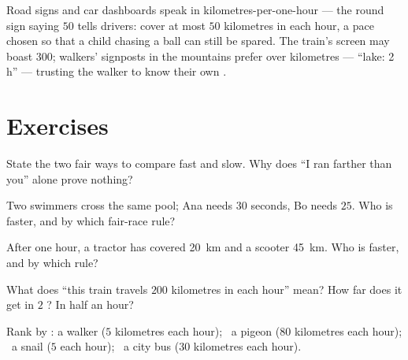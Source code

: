 \begin{example}\label{ex:g5:speed-distance-time:signs}
Road signs and car dashboards speak in kilometres-per-one-hour ---
the round sign saying $50$ tells drivers: cover at most $50$
kilometres in each hour, a pace chosen so that a child chasing a
ball can still be spared. The  train's screen may boast
$300$; walkers' signposts in the mountains prefer  over
kilometres --- ``lake: 2 h'' --- trusting the walker to know their
own .
\end{example}

\section{Exercises}

\begin{exercise}[$\star$]\label{exo:g5:speed-distance-time:1}
State the two fair ways to compare fast and slow. Why does ``I ran
farther than you'' alone prove nothing?
\end{exercise}

\begin{exercise}[$\star$]\label{exo:g5:speed-distance-time:2}
Two swimmers cross the same pool; Ana needs $30$ seconds, Bo needs
$25$. Who is faster, and by which fair-race rule?
\end{exercise}

\begin{exercise}[$\star$]\label{exo:g5:speed-distance-time:3}
After one hour, a tractor has covered \qty{20}{km} and a scooter
\qty{45}{km}. Who is faster, and by which rule?
\end{exercise}

\begin{exercise}[$\star$]\label{exo:g5:speed-distance-time:4}
What does ``this train travels $200$ kilometres in each hour''
mean? How far does it get in $2$ ? In half an hour?
\end{exercise}

\begin{exercise}[$\star$]\label{exo:g5:speed-distance-time:5}
Rank by : a walker ($5$ kilometres each hour); \ a pigeon
($80$ kilometres each hour); \ a snail ($5$ \emph{} each
hour); \ a city bus ($30$ kilometres each hour).
\end{exercise}

